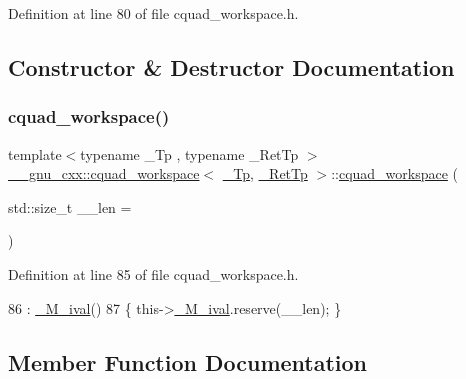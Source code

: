 Definition at line 80 of file cquad\+\_\+workspace.\+h.



\subsection{Constructor \& Destructor Documentation}
\mbox{\label{struct____gnu__cxx_1_1cquad__workspace_a3d7601160fd8f630b70109b61f493738}} 
\subsubsection{\texorpdfstring{cquad\+\_\+workspace()}{cquad\_workspace()}}
{\footnotesize\ttfamily template$<$typename \+\_\+\+Tp , typename \+\_\+\+Ret\+Tp $>$ \\
\hyperlink{struct____gnu__cxx_1_1cquad__workspace}{\+\_\+\+\_\+gnu\+\_\+cxx\+::cquad\+\_\+workspace}$<$ \hyperlink{namespace____gnu__cxx_a3b19a9c800ca194374ef9172290f7d79}{\+\_\+\+Tp}, \hyperlink{namespace____gnu__cxx_a886e03ece3d53ff7fa6c098a40f93fa5}{\+\_\+\+Ret\+Tp} $>$\+::\hyperlink{struct____gnu__cxx_1_1cquad__workspace}{cquad\+\_\+workspace} (\begin{DoxyParamCaption}\item[{std\+::size\+\_\+t}]{\+\_\+\+\_\+len = {} }\end{DoxyParamCaption})\hspace{0.3cm}{\ttfamily [inline]}}



Definition at line 85 of file cquad\+\_\+workspace.\+h.


\begin{DoxyCode}
86       : \hyperlink{struct____gnu__cxx_1_1cquad__workspace_a46edeb05c52f2a406dc582b404fe83e6}{\_M\_ival}()
87       \{ this->\hyperlink{struct____gnu__cxx_1_1cquad__workspace_a46edeb05c52f2a406dc582b404fe83e6}{\_M\_ival}.reserve(\_\_len); \}
\end{DoxyCode}


\subsection{Member Function Documentation}
\mbox{\label{struct____gnu__cxx_1_1cquad__workspace_adf18a306dbf58cb00b4c6254266816bc}} 

